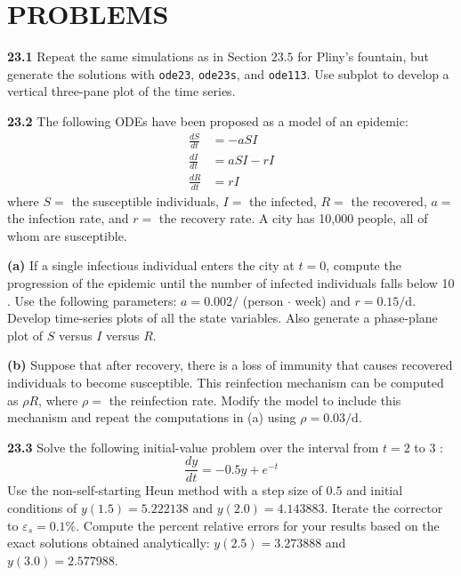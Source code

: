 \documentclass[../main.tex]{subfiles}
\begin{document}
\section{PROBLEMS}

\begin{multicols}{2}
    \noindent \textbf{23.1} Repeat the same simulations as in Section $23.5$ for Pliny's fountain, but generate the solutions with \texttt{ode23}, \texttt{ode23s}, and \texttt{ode113}. Use subplot to develop a vertical three-pane plot of the time series.\vspace{2mm}

    \noindent \textbf{23.2} The following ODEs have been proposed as a model of an epidemic:
    $$
    \begin{aligned}
    \frac{d S}{d t} &=-a S I \\
    \frac{d I}{d t} &=a S I-r I \\
    \frac{d R}{d t} &=r I
    \end{aligned}
    $$
    where $S=$ the susceptible individuals, $I=$ the infected, $R=$ the recovered, $a=$ the infection rate, and     $r=$ the recovery rate. A city has 10,000 people, all of whom are susceptible.

    \noindent\textbf{(a)} If a single infectious individual enters the city at $t=0$, compute the progression of    the epidemic until the number of infected individuals falls below 10 . Use the following parameters: $a=0.002  /$ (person $\cdot$ week) and $r=0.15 / \mathrm{d}$. Develop time-series plots of all the state variables.    Also generate a phase-plane plot of $S$ versus $I$ versus $R$.

    \noindent\textbf{(b)} Suppose that after recovery, there is a loss of immunity that causes recovered    individuals to become susceptible. This reinfection mechanism can be computed as $\rho R$, where $\rho=$ the   reinfection rate. Modify the model to include this mechanism and repeat the computations in (a) using $\rho=0.    03 / \mathrm{d}$.\vspace{2mm}

    \noindent \textbf{23.3} Solve the following initial-value problem over the interval from $t=2$ to 3 :
    $$
    \frac{d y}{d t}=-0.5 y+e^{-t}
    $$
    Use the non-self-starting Heun method with a step size of $0.5$ and initial conditions of $y(1.5)=5.222138$     and $y(2.0)=4.143883$. Iterate the corrector to $\varepsilon_{s}=0.1 \%$. Compute the percent relative errors   for your results based on the exact solutions obtained analytically: $y(2.5)=3.273888$ and $y(3.0)=2.577988$. \vspace{2mm}


\end{multicols}
\end{document}
